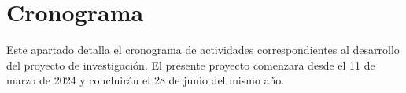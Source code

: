 \section{Cronograma}
Este apartado detalla el cronograma de actividades correspondientes al desarrollo del proyecto de investigación. El presente proyecto comenzara desde el 11 de marzo de 2024 y concluirán el 28 de junio del mismo año.